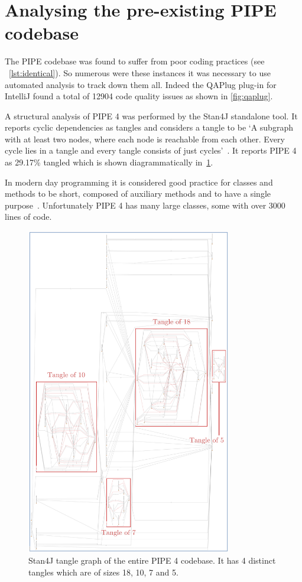  \section{Analysing the pre-existing PIPE codebase}
The PIPE codebase was found to suffer from poor coding practices (see ~\cref{lst:identical}). So numerous were these instances it was necessary to use automated analysis to track down them all. Indeed the QAPlug plug-in for IntelliJ found a total of \num{12904} code quality issues as shown in \cref{fig:qaplug}.

A structural analysis of PIPE 4 was performed by the Stan4J standalone tool. It reports cyclic dependencies as tangles and considers a tangle to be `A subgraph with at least two nodes, where each node is reachable from each other. Every cycle lies in a tangle and every tangle consists of just cycles'~\cite{stan_whitepaper}. It reports PIPE 4 as 29.17\% tangled which is shown diagrammatically in~\cref{fig:tangle}.

In modern day programming it is considered good practice for classes and methods to be short, composed of auxiliary methods and to have a single purpose~\cite{so_can_a_function_be_too_short}. Unfortunately PIPE 4 has many large classes, some with over \num{3000} lines of code. 





\begin{figure}[tb]
\begin{center}
    \includegraphics[width=0.8\textwidth]{analysis/tangle_annotated.png} 
    \caption{Stan4J tangle graph of the entire PIPE 4 codebase. It has 4 distinct tangles which are of sizes 18, 10, 7 and 5.}
    \label{fig:tangle}
\end{center}
\end{figure}